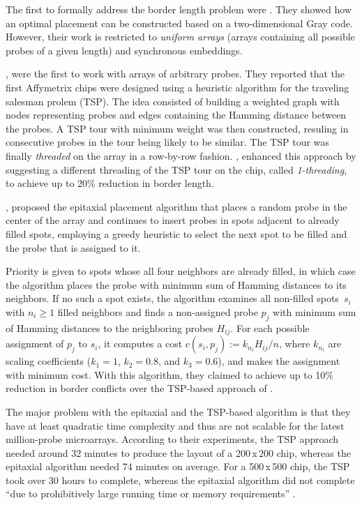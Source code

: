\documentclass{bioinfo}
\begin{document}
The first to formally address the border length problem were \citealp{FELDMAN93}. They showed how an optimal placement can be constructed based on a two-dimensional Gray code. However, their work is restricted to \emph{uniform arrays} (arrays containing all possible probes of a given length) and synchronous embeddings.

\citealp{HANNENHALLI02}, were the first to work with arrays of arbitrary probes. They reported that the first Affymetrix chips were designed using a heuristic algorithm for the traveling salesman prolem (TSP). The idea consisted of building a weighted graph with nodes representing probes and edges containing the Hamming distance between the probes. A TSP tour with minimum weight was then constructed, resuling in consecutive probes in the tour being likely to be similar. The TSP tour was finally \emph{threaded} on the array in a row-by-row fashion. \citealp{HANNENHALLI02}, enhanced this approach by suggesting a different threading of the TSP tour on the chip, called \emph{1-threading}, to achieve up to 20\% reduction in border length.

\citealp{KAHNG02}, proposed the epitaxial placement algorithm that places a random probe in the center of the array and continues to insert probes in spots adjacent to already filled spots, employing a greedy heuristic to select the next spot to be filled and the probe that is assigned to it.

Priority is given to spots whose all four neighbors are already filled, in which case the algorithm places the probe with minimum sum of Hamming distances to its neighbors. If no such a spot exists, the algorithm examines all non-filled spots~$s_i$ with $n_i \geq 1$ filled neighbors and finds a non-assigned probe $p_j$ with minimum sum of Hamming distances to the neighboring probes $H_{ij}$. For each possible assignment of $p_j$ to $s_i$, it computes a cost $c(s_i,p_j) := k_{n_i} H_{ij} / n$, where $k_{n_i}$ are scaling coefficients ($k_1 = 1$, $k_2 = 0.8$, and $k_3 = 0.6$), and makes the assignment with minimum cost. With this algorithm, they claimed to achieve up to 10\% reduction in border conflicts over the TSP-based approach of \citealp{HANNENHALLI02}.

The major problem with the epitaxial and the TSP-based algorithm is that they have at least quadratic time complexity and thus are not scalable for the latest million-probe microarrays. According to their experiments, the TSP approach needed around 32 minutes to produce the layout of a 200\,x\,200 chip, whereas the epitaxial algorithm needed 74 minutes on average. For a 500\,x\,500 chip, the TSP took over 30 hours to complete, whereas the epitaxial algorithm did not complete ``due to prohibitively large running time or memory requirements'' \citep{KAHNG02}.
\end{document}
